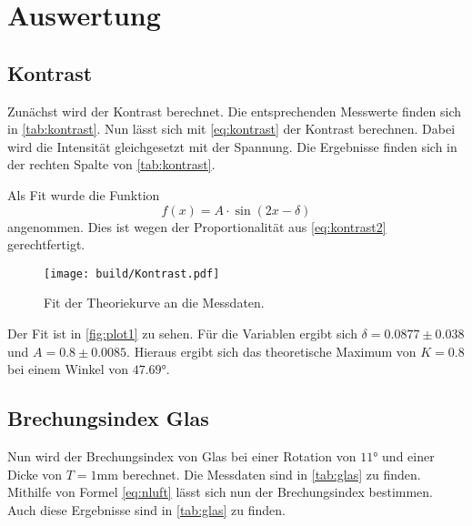 \section{Auswertung}
\label{sec:Auswertung}

\subsection{Kontrast}
Zunächst wird der Kontrast berechnet.
Die entsprechenden Messwerte finden sich in \autoref{tab:kontrast}.
Nun lässt sich mit \autoref{eq:kontrast} der Kontrast berechnen. Dabei wird die Intensität gleichgesetzt mit der Spannung.
Die Ergebnisse finden sich in der rechten Spalte von \autoref{tab:kontrast}.

Als Fit wurde die Funktion 
\begin{equation*}
    f(x) = A \cdot \sin(2 x - \delta)
\end{equation*}
angenommen. Dies ist wegen der Proportionalität aus \autoref{eq:kontrast2} gerechtfertigt.
\begin{figure}
    \centering
    \texttt{[image: build/Kontrast.pdf]}
    \caption{Fit der Theoriekurve an die Messdaten.}
    \label{fig:plot1}
\end{figure}
Der Fit ist in \autoref{fig:plot1} zu sehen.
Für die Variablen ergibt sich $\delta = 0.0877 \pm 0.038$ und $A = 0.8 \pm 0.0085$.
Hieraus ergibt sich das theoretische Maximum von $K = 0.8$ bei einem Winkel von $47.69°$.

\subsection{Brechungsindex Glas}
Nun wird der Brechungsindex von Glas bei einer Rotation von $11°$ und einer Dicke von $T = 1 \unit{\milli\meter}$ berechnet.
Die Messdaten sind in \autoref{tab:glas} zu finden.
Mithilfe von Formel \autoref{eq:nluft} lässt sich nun der Brechungsindex bestimmen.
Auch diese Ergebnisse sind in \autoref{tab:glas} zu finden.


